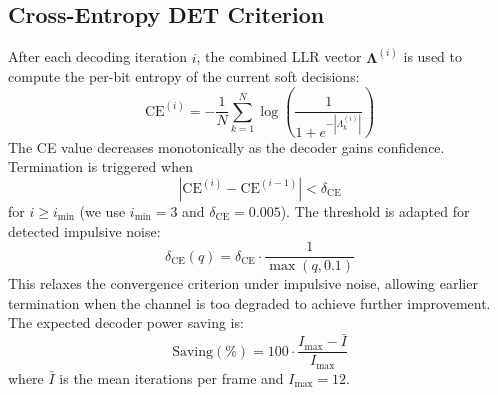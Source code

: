 \documentclass[journal,twocolumn]{IEEEtran}
\newcommand{\detabb}{\textsf{DET}}
\begin{document}
\subsection{Cross-Entropy \detabb{} Criterion}
After each decoding iteration $i$, the combined LLR vector
$\boldsymbol{\Lambda}^{(i)}$ is used to compute the per-bit entropy of
the current soft decisions:
\begin{equation}
  \mathrm{CE}^{(i)} = -\frac{1}{N}\sum_{k=1}^{N}
    \log\!\left(\frac{1}{1+e^{-|\Lambda_k^{(i)}|}}\right)
\end{equation}
The CE value decreases monotonically as the decoder gains confidence.
Termination is triggered when
\begin{equation}
  \left|\mathrm{CE}^{(i)} - \mathrm{CE}^{(i-1)}\right| < \delta_{\mathrm{CE}}
\end{equation}
for $i \geq i_{\min}$ (we use $i_{\min} = 3$ and
$\delta_{\mathrm{CE}} = 0.005$).  The threshold is adapted for
detected impulsive noise:
\begin{equation}
  \delta_{\mathrm{CE}}(q) = \delta_{\mathrm{CE}} \cdot \frac{1}{\max(q, 0.1)}
\end{equation}
This relaxes the convergence criterion under impulsive noise, allowing
earlier termination when the channel is too degraded to achieve further
improvement.  The expected decoder power saving is:
\begin{equation}
  \text{Saving}(\%) = 100 \cdot \frac{I_{\max} - \bar{I}}{I_{\max}}
\end{equation}
where $\bar{I}$ is the mean iterations per frame and $I_{\max}=12$.
\end{document}
